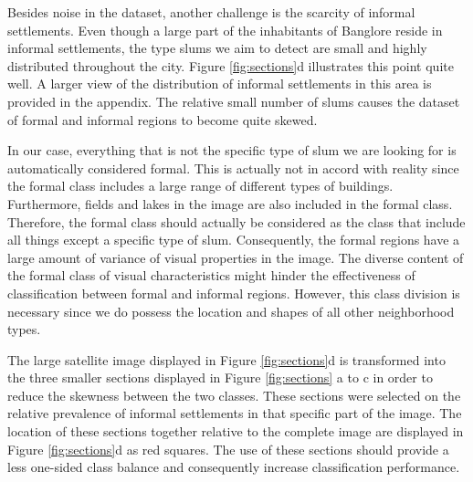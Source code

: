 Besides noise in the dataset, another challenge is the scarcity of informal settlements.  Even though a large part of the inhabitants of Banglore reside in informal settlements, the type slums we aim to detect are small and highly distributed throughout the city. Figure \ref{fig:sections}d illustrates this point quite well. A larger view of the distribution of informal settlements in this area is provided in the appendix. The relative small number of slums causes the dataset of formal and informal regions to become quite skewed.

In our case, everything that is not the specific type of slum we are looking for is automatically considered formal. This is actually not in accord with reality since the formal class includes a large range of different types of buildings. Furthermore, fields and lakes in the image are also included in the formal class. Therefore, the formal class should actually be considered as the class that include all things except a specific type of slum. Consequently, the formal regions have a large amount of variance of visual properties in the image. The diverse content of the formal class of visual characteristics might hinder the effectiveness of classification between formal and informal regions. However, this class division is necessary since we do possess the location and shapes of all other neighborhood types.

The large satellite image displayed in Figure \ref{fig:sections}d is transformed into the three smaller sections displayed in Figure \ref{fig:sections} a to c in order to reduce the skewness between the two classes. These sections were selected on the relative prevalence of informal settlements in that specific part of the image. The location of these sections together relative to the complete image are displayed in Figure \ref{fig:sections}d as red squares. The use of these sections should provide a less one-sided class balance and consequently increase classification performance. 



